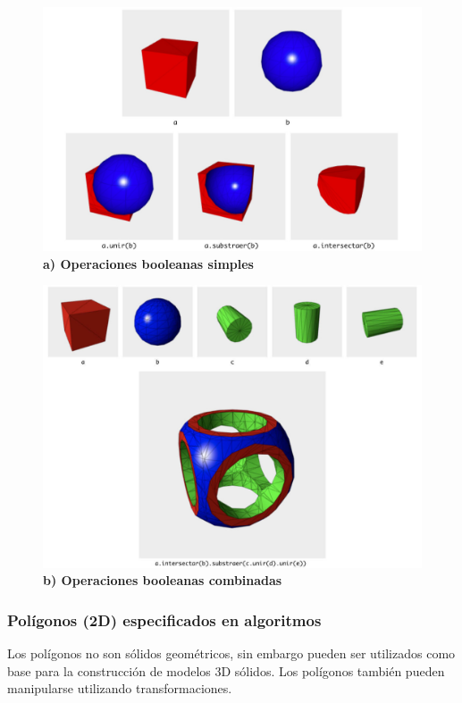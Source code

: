 \begin{figure}[h]
\includegraphics[width=14cm]{Img/Modelos/modelado15.jpg}
\centering
\caption{\textbf{ \footnotesize{a) Operaciones booleanas simples }}}
\label{aCSG}
\end{figure}


\begin{figure}[h]
\includegraphics[width=16cm]{Img/Modelos/modelado16a.jpg}
\centering
\caption{\textbf{ \footnotesize{b) Operaciones booleanas combinadas }}}
\label{bCSG}
\end{figure}
\clearpage

\subsubsection{Polígonos (2D) especificados en algoritmos}
Los polígonos no son sólidos geométricos, sin embargo pueden ser utilizados como base para la construcción de modelos 3D sólidos. Los polígonos también pueden manipularse utilizando transformaciones.

